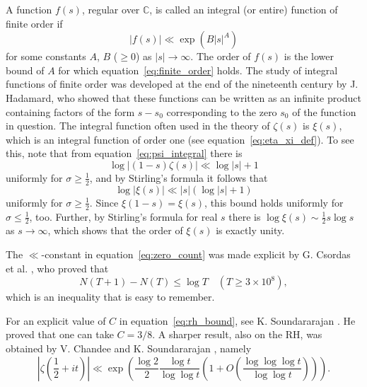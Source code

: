 \documentclass[11pt]{article}
\begin{document}
A function $f(s)$, regular over $\mathbb{C}$, is called an integral (or entire) function of finite order if
\begin{equation}\label{eq:finite_order}
|f(s)| \ll \exp(B|s|^A)
\end{equation}
for some constants $A$, $B$ ($\geq 0$) as $|s| \to \infty$. The order of $f(s)$ is the lower bound of $A$ for which equation~\eqref{eq:finite_order} holds. The study of integral functions of finite order was developed at the end of the nineteenth century by J. Hadamard, who showed that these functions can be written as an infinite product containing factors of the form $s - s_0$ corresponding to the zero $s_0$ of the function in question. The integral function often used in the theory of $\zeta(s)$ is $\xi(s)$, which is an integral function of order one (see equation~\eqref{eq:eta_xi_def}). To see this, note that from equation~\eqref{eq:psi_integral} there is
\begin{equation}\label{eq:xi_bound_prep}
\log |(1-s)\zeta(s)| \ll \log |s| + 1
\end{equation}
uniformly for $\sigma \geq \frac{1}{2}$, and by Stirling's formula it follows that
\begin{equation}\label{eq:xi_order_bound}
\log |\xi(s)| \ll |s|(\log |s| + 1)
\end{equation}
uniformly for $\sigma \geq \frac{1}{2}$. Since $\xi(1-s) = \xi(s)$, this bound holds uniformly for $\sigma \leq \frac{1}{2}$, too. Further, by Stirling's formula for real $s$ there is $\log \xi(s) \sim \frac{1}{2}s \log s$ as $s \to \infty$, which shows that the order of $\xi(s)$ is exactly unity.

The $\ll$-constant in equation~\eqref{eq:zero_count} was made explicit by G. Csordas et al. \cite{COSV}, who proved that
\begin{equation}\label{eq:explicit_zero_bound}
N(T+1) - N(T) \leq \log T \quad (T \geq 3 \times 10^8),
\end{equation}
which is an inequality that is easy to remember.

For an explicit value of $C$ in equation~\eqref{eq:rh_bound}, see K. Soundararajan \cite{Sou4}. He proved that one can take $C = 3/8$. A sharper result, also on the RH, was obtained by V. Chandee and K. Soundararajan \cite{ChSo}, namely
\begin{equation}\label{eq:chandee_sound}
\left|\zeta\left(\frac{1}{2} + it\right)\right| \ll \exp\left(\frac{\log 2}{2} \frac{\log t}{\log \log t}\left(1 + O\left(\frac{\log \log \log t}{\log \log t}\right)\right)\right).
\end{equation}
\end{document}
